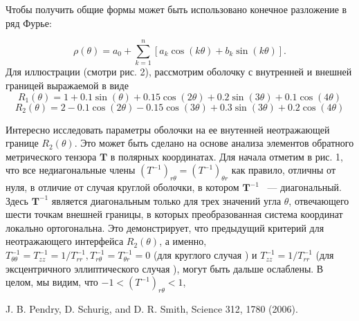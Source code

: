 \documentclass[a4paper, 12pt]{article}
\begin{document}
Чтобы получить общие формы может быть использовано конечное разложение
в ряд Фурье:

\begin{equation}
	\rho(\theta)=a_0+\sum\limits_{k=1}^{n}[a_k\cos(k\theta)+b_k\sin(k\theta)].
\end{equation}
Для иллюстрации (смотри рис. 2), рассмотрим оболочку с внутренней и внешней 
границей выражаемой в виде
\begin{equation*}
	R_1(\theta)=1+0.1\sin(\theta)+0.15\cos(2\theta)+0.2\sin(3\theta)
	+0.1\cos(4\theta)
\end{equation*}
\begin{equation}
	R_2(\theta) = 2-0.1\cos(2\theta)-0.15\cos(3\theta)+0.3\sin(3\theta)+
	0.2\cos(4\theta)
\end{equation}

Интересно исследовать параметры оболочки на ее внутенней неотражающей границе
$R_2(\theta)$. Это может быть сделано на основе анализа элементов
обратного метрического тензора $\mathbf{T}$ в полярных координатах.
Для начала отметим в рис. 1, что все недиагональные члены 
$(T^{-1})_{r\theta}=(T^{-1})_{\theta r}$ как правило, отличны от нуля,
в отличие от случая круглой оболочки, в котором $\mathbf{T}^{-1}$ ~--- 
диагональный. Здесь $\mathbf{T}^{-1}$ является диагональным только
для трех значений угла $\theta$, отвечающего шести точкам внешней границы,
в которых преобразованная система координат локально ортогональна.
Это демонстрирует, что предыдущий критерий для неотражающего интерфейса
$R_2(\theta)$, а именно, $T^{-1}_{\theta\theta}=T^{-1}_{zz}=1/
T^{-1}_{rr}, T^{-1}_{r\theta}=T^{-1}_{\theta r}=0$ (для круглого случая \cite{4}) 
и $T^{-1}_{zz}=1/T^{-1}_{rr}$ (для эксцентричного эллиптического случая \cite{11}),
могут быть дальше ослаблены. В целом, мы видим, что $-1<(T^{-1})_{r\theta} < 1$,

\begin{thebibliography}{99}
J. B. Pendry, D. Schurig, and D. R. Smith, Science 312, 1780 (2006).

\end{thebibliography}
\end{document}
